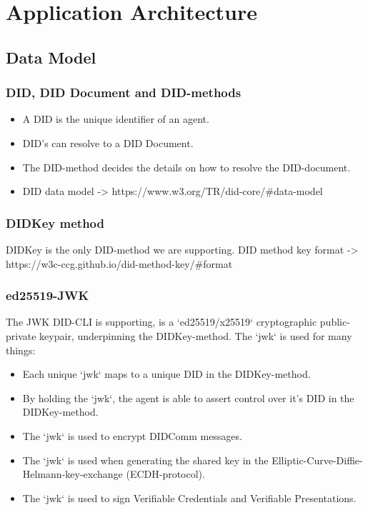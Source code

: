 \chapter{Application Architecture}

\section{Data Model}



\subsection{DID, DID Document and DID-methods}
\begin{itemize}
\item A DID is the unique identifier of an agent.
\item DID's can resolve to a DID Document.
\item The DID-method decides the details on how to resolve the DID-document.
\item DID data model -> https://www.w3.org/TR/did-core/#data-model
\end{itemize}



\subsection{DIDKey method}

DIDKey is the only DID-method we are supporting. DID method key format -> https://w3c-ccg.github.io/did-method-key/#format



\subsection{ed25519-JWK}

The JWK DID-CLI is supporting, is a `ed25519/x25519` cryptographic public-private keypair, underpinning the DIDKey-method. The `jwk` is used for many things:
\begin{itemize}
\item Each unique `jwk` maps to a unique DID in the DIDKey-method.
\item By holding the `jwk`, the agent is able to assert control over it's DID in the DIDKey-method.
\item The `jwk` is used to encrypt DIDComm messages.
\item The `jwk` is used when generating the shared key in the Elliptic-Curve-Diffie-Helmann-key-exchange (ECDH-protocol).
\item The `jwk` is used to sign Verifiable Credentials and Verifiable Presentations.
\end{itemize}

